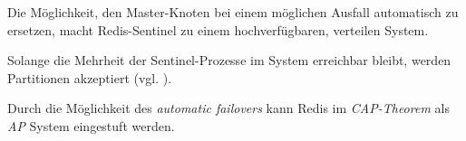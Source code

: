 Die Möglichkeit, den Master-Knoten bei einem möglichen Ausfall automatisch zu ersetzen, macht \acs{Redis}-Sentinel zu einem hochverfügbaren, verteilen System.

Solange die Mehrheit der Sentinel-Prozesse im System erreichbar bleibt, werden Partitionen akzeptiert (vgl. \cite{Redis-Sentinal}).

Durch die Möglichkeit des \textit{automatic failovers} kann Redis im \textit{\acs{CAP}-Theorem} als \textit{AP} System eingestuft werden.